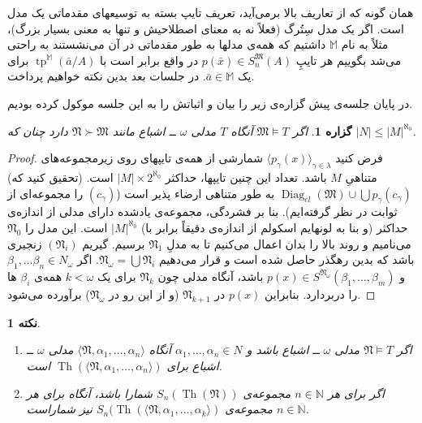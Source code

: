 \documentclass[12pt,a4paper]{report}
\theoremstyle{colorhead}
\newtheorem{prop}[thm]{گزاره}
\newtheorem{nokte}[thm]{نکته}
\DeclareMathOperator{\Th}{Th}
\DeclareMathOperator{\diag}{Diag}
\DeclareMathOperator{\tp}{tp}
\begin{document}
همان گونه که از تعاریف بالا برمی‌آید، 
تعریف تایپ
بسته به توسیعهای مقدماتی یک مدل است. 
اگر یک مدل سِتُرگ (فعلاً 
نه به معنای اصطلاحیش و تنها به معنی
بسیار بزرگ)، مثلاً به نام
$\mathbb{M}$
داشتیم که همه‌ی مدلها به طور مقدماتی در آن می‌نشستند به راحتی
می‌شد بگوییم 
هر تایپِ
$p(\bar{x})\in S^\mathfrak{M}_n(A)$
در واقع برابر است با
$\tp^\mathbb{M}(\bar{a}/A)$
برای یک
$\bar{a}\in \mathbb{M}$.
در جلسات بعد بدین نکته خواهیم پرداخت. 
\par 
در پایان جلسه‌ی پیش گزاره‌ی زیر را بیان و اثباتش را به این جلسه موکول کرده‌ بودیم.
\begin{prop}
\label{eshba'sizekuchak}
اگر
$\mathfrak{M}\models T$
آنگاه 
$T$
مدلی
$\omega$
ــ
اشباع مانند
$\mathfrak{N}\succ \mathfrak{M}$
دارد چنان که
$|N|\leq |M|^{\aleph_0}$.
\end{prop}
\begin{proof}
فرض کنید
$\langle p_\gamma(x)\rangle_{\gamma\in \lambda}$
شمارشی از همه‌ی تایپهای روی زیرمجموعه‌های متناهیِ
$M$
باشد. تعداد این چنین تایپها، حداکثر
$|M|\times 2^{\aleph_0}$
است. (تحقیق کنید که)
$\diag_{el}(\mathfrak{M})\cup \bigcup p_\gamma(c_\gamma)$
به طور متناهی ارضاء پذیر است ($(c_\gamma)$ را مجموعه‌ای از ثوابت در نظر گرفته‌ایم).
بنا بر فشردگی، مجموعه‌ی یادشده دارای مدلی از اندازه‌ی حداکثر (و بنا به لونهایم اسکولم از اندازه‌ی دقیقاً برابر با)
$|M|^{\aleph_0}$
است. این مدل را
$\mathfrak{N}_0$
می‌نامیم و روند بالا را بدان اعمال می‌کنیم تا به مدلِ
$\mathfrak{N}_1$
برسیم. گیریم
$(\mathfrak{N}_i)$
زنجیری باشد که بدین رهگذر حاصل شده است و قرار می‌دهیم
$\mathfrak{N}_\omega=\bigcup \mathfrak{N}_i$.
اگر
$\beta_1,\ldots\beta_n\in N_\omega$
و
$p(x)\in S^{\mathfrak{N}_\omega}(\beta_1,\ldots,\beta_m)$
باشد، آنگاه مدلی چون
$\mathfrak{N}_k$
برای یک
$k<\omega$
همه‌ی
$\beta_i$
ها را دربردارد. بنابراین
$p(x)$
در
$\mathfrak{N}_{k+1}$
(و از این رو در
$\mathfrak{N}_\omega$)
برآورده می‌شود. 
\end{proof}
\begin{nokte}
\hfill
\begin{enumerate}
\item
اگر
$\mathfrak{N}\models T$
مدلی
$\omega$
ــ
اشباع باشد و 
$\alpha_1,\ldots,\alpha_n\in N$
آنگاه
$\langle \mathfrak{N},\alpha_1,\ldots,\alpha_n\rangle$
مدلی 
$\omega$
ــ 
اشباع برای
$\Th(\langle \mathfrak{N},\alpha_1,\ldots,\alpha_n\rangle)$
است. 
\item 
اگر برای هر
$n\in \mathbb{N}$
مجموعه‌ی
$S_n(\Th(\mathfrak{N}))$
شمارا باشد،‌
آنگاه 
برای هر
$n\in \mathbb{N}$
مجموعه‌ی
$S_n(\Th(\langle \mathfrak{N},\alpha_1,\ldots,\alpha_k\rangle)$
نیز شماراست.
\end{enumerate}
\end{nokte}
\end{document}
